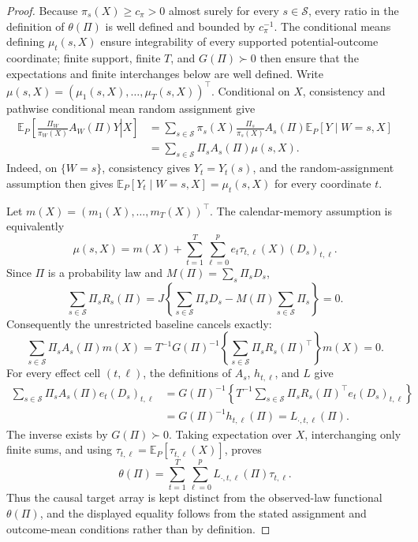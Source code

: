 \documentclass{article}
\begin{document}
\begin{proof}
Because \(\pi_s(X)\geq c_{\pi}>0\) almost surely for every \(s\in\mathcal S\), every ratio in the definition of \(\theta(\Pi)\) is well defined and bounded by \(c_{\pi}^{-1}\).  The conditional means defining \(\mu_t(s,X)\) ensure integrability of every supported potential-outcome coordinate; finite support, finite \(T\), and \(G(\Pi)\succ0\) then ensure that the expectations and finite interchanges below are well defined.  Write \(\mu(s,X)=(\mu_1(s,X),\ldots,\mu_T(s,X))^{\top}\).  Conditional on \(X\), consistency and pathwise conditional mean random assignment give
\[
\begin{aligned}
\mathbb E_P\!\left[\left.\frac{\Pi_W}{\pi_W(X)}A_W(\Pi)Y\right|X\right]
&=\sum_{s\in\mathcal S}\pi_s(X)\frac{\Pi_s}{\pi_s(X)}A_s(\Pi)
  \mathbb E_P[Y\mid W=s,X]\\
&=\sum_{s\in\mathcal S}\Pi_sA_s(\Pi)\mu(s,X).
\end{aligned}
\]
Indeed, on \(\{W=s\}\), consistency gives \(Y_t=Y_t(s)\), and the random-assignment assumption then gives \(\mathbb E_P[Y_t\mid W=s,X]=\mu_t(s,X)\) for every coordinate \(t\).

Let \(m(X)=(m_1(X),\ldots,m_T(X))^{\top}\).  The calendar-memory assumption is equivalently
\[
 \mu(s,X)=m(X)+\sum_{t=1}^{T}\sum_{\ell=0}^{p}
 e_t\tau_{t,\ell}(X)(D_s)_{t,\ell}.
\]
Since \(\Pi\) is a probability law and \(M(\Pi)=\sum_s\Pi_sD_s\),
\[
 \sum_{s\in\mathcal S}\Pi_sR_s(\Pi)
 =J\left\{\sum_{s\in\mathcal S}\Pi_sD_s-M(\Pi)\sum_{s\in\mathcal S}\Pi_s\right\}=0.
\]
Consequently the unrestricted baseline cancels exactly:
\[
 \sum_{s\in\mathcal S}\Pi_sA_s(\Pi)m(X)
 =T^{-1}G(\Pi)^{-1}
   \left\{\sum_{s\in\mathcal S}\Pi_sR_s(\Pi)^{\top}\right\}m(X)=0.
\]
For every effect cell \((t,\ell)\), the definitions of \(A_s\), \(h_{t,\ell}\), and \(L\) give
\[
\begin{aligned}
 \sum_{s\in\mathcal S}\Pi_sA_s(\Pi)e_t(D_s)_{t,\ell}
 &=G(\Pi)^{-1}\left\{T^{-1}\sum_{s\in\mathcal S}
   \Pi_sR_s(\Pi)^{\top}e_t(D_s)_{t,\ell}\right\}\\
 &=G(\Pi)^{-1}h_{t,\ell}(\Pi)
 =L_{\cdot,t,\ell}(\Pi).
\end{aligned}
\]
The inverse exists by \(G(\Pi)\succ0\).  Taking expectation over \(X\), interchanging only finite sums, and using \(\tau_{t,\ell}=\mathbb E_P[\tau_{t,\ell}(X)]\), proves
\[
 \theta(\Pi)=\sum_{t=1}^{T}\sum_{\ell=0}^{p}
 L_{\cdot,t,\ell}(\Pi)\tau_{t,\ell}.
\]
Thus the causal target array is kept distinct from the observed-law functional \(\theta(\Pi)\), and the displayed equality follows from the stated assignment and outcome-mean conditions rather than by definition.


\end{proof}
\end{document}
